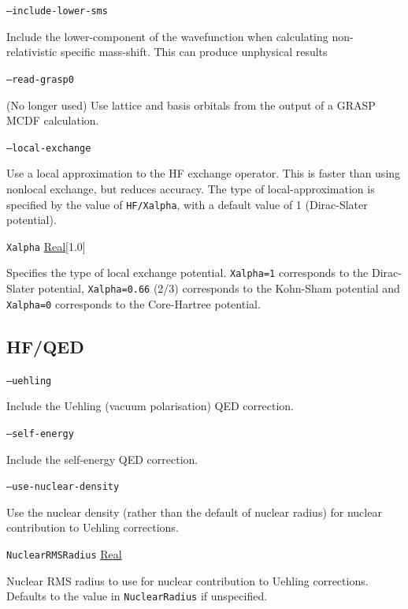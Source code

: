 \documentclass{report}
\begin{document}
\texttt{--include-lower-sms}
\begin{adjustwidth}{1cm}{}
Include the lower-component of the wavefunction when calculating non-relativistic specific mass-shift.
This can produce unphysical results
\end{adjustwidth}

\texttt{--read-grasp0}
\begin{adjustwidth}{1cm}{}
(No longer used) Use lattice and basis orbitals from the output of a GRASP MCDF calculation.
\end{adjustwidth}

\texttt{--local-exchange}
\begin{adjustwidth}{1cm}{}
Use a local approximation to the HF exchange operator. This is faster than using nonlocal exchange, but
reduces accuracy. The type of local-approximation is specified by the value of \texttt{HF/Xalpha}, with
a default value of 1 (Dirac-Slater potential).
\end{adjustwidth}

\texttt{Xalpha} \uline{Real}[1.0]
\begin{adjustwidth}{1cm}{}
Specifies the type of local exchange potential. \texttt{Xalpha=1} corresponds to the Dirac-Slater
potential, \texttt{Xalpha=0.66} (2/3) corresponds to the Kohn-Sham potential and \texttt{Xalpha=0}
corresponds to the Core-Hartree potential.
\end{adjustwidth}

\subsection{HF/QED}
\texttt{--uehling}
\begin{adjustwidth}{1cm}{}
Include the Uehling (vacuum polarisation) QED correction.
\end{adjustwidth}

\texttt{--self-energy}
\begin{adjustwidth}{1cm}{}
Include the self-energy QED correction.
\end{adjustwidth}

\texttt{--use-nuclear-density}
\begin{adjustwidth}{1cm}{}
Use the nuclear density (rather than the default of nuclear radius) for nuclear contribution to Uehling 
corrections.
\end{adjustwidth}

\texttt{NuclearRMSRadius} \uline{Real}
\begin{adjustwidth}{1cm}{}
Nuclear RMS radius to use for nuclear contribution to Uehling corrections. Defaults to the value in 
\texttt{NuclearRadius} if unspecified.
\end{adjustwidth}
\end{document}
